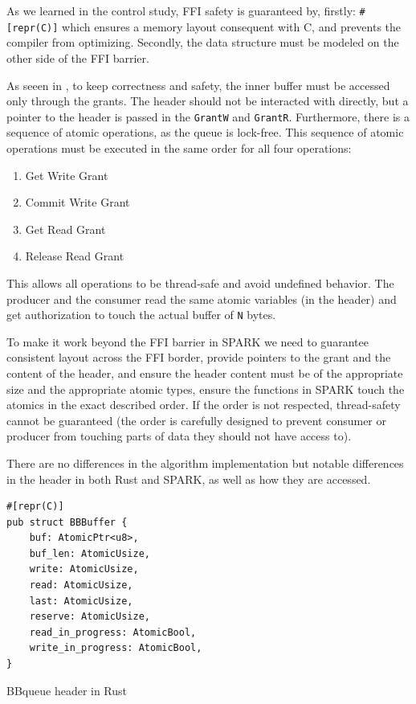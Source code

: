 \documentclass[nomenclature, english, bibtex]{kththesis}
\begin{document}
As we learned in the control study,  FFI safety is guaranteed by, firstly:  \texttt{\#[repr(C)]} which ensures a memory layout consequent with C, and prevents the compiler from optimizing. Secondly, the data structure must be modeled on the other side of the FFI barrier.

As seeen in , to keep correctness and safety, the inner buffer must be accessed only through the grants. The header should not be interacted with directly, but a pointer to the header is passed in the  \texttt{GrantW} and \texttt{GrantR}. Furthermore, there is a sequence of atomic operations, as the queue is lock-free. This sequence of atomic operations must be executed in the same order for all four operations:
\begin{enumerate}
    \item Get Write Grant
    \item Commit Write Grant
    \item Get Read Grant
    \item Release Read Grant
\end{enumerate}
   
This allows all operations to be thread-safe and avoid undefined behavior. The producer and the consumer read the same atomic variables (in the header) and get authorization to touch the actual buffer of \texttt{N} bytes.


To make it work beyond the FFI barrier in SPARK we need to guarantee consistent layout across the FFI border, provide pointers to the grant and the content of the header, and ensure the header content must be of the appropriate size and the appropriate atomic types, ensure the functions in SPARK touch the atomics in the exact described order. If the order is not respected, thread-safety cannot be guaranteed (the order is carefully designed to prevent consumer or producer from touching parts of data they should not have access to).

There are no differences in the algorithm implementation but notable differences in the header in both Rust and SPARK, as well as how they are accessed.

\begin{listing}[!ht]
\begin{verbatim}
#[repr(C)]
pub struct BBBuffer {
    buf: AtomicPtr<u8>,
    buf_len: AtomicUsize,
    write: AtomicUsize,
    read: AtomicUsize,
    last: AtomicUsize,
    reserve: AtomicUsize,
    read_in_progress: AtomicBool,
    write_in_progress: AtomicBool,
}
\end{verbatim}
\caption[BBqueue header in Rust]{BBqueue header in Rust}
\label{lst:rust_bbqueue_header}
\end{listing}
\FloatBarrier
\end{document}
